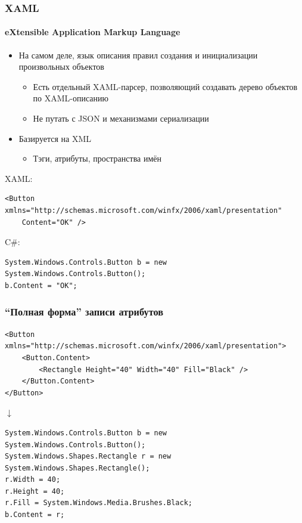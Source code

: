 \documentclass[xetex,mathserif,serif]{beamer}
\newcommand{\DownArrow} {
	\hspace{2cm}\begin{LARGE}$\downarrow$\end{LARGE}
}
\begin{document}
	\begin{frame}[fragile]
		\frametitle{XAML}
		\framesubtitle{eXtensible Application Markup Language}
		\begin{itemize}
			\item На самом деле, язык описания правил создания и инициализации произвольных объектов
			\begin{itemize}
				\item Есть отдельный XAML-парсер, позволяющий создавать дерево объектов по XAML-описанию
				\item Не путать с JSON и механизмами сериализации
			\end{itemize}
			\item Базируется на XML
			\begin{itemize}
				\item Тэги, атрибуты, пространства имён
			\end{itemize}
		\end{itemize}

		XAML:
		\begin{footnotesize}
			\begin{verbatim}
<Button xmlns="http://schemas.microsoft.com/winfx/2006/xaml/presentation"
    Content="OK" />
			\end{verbatim}
		\end{footnotesize}

		C\#:
		\begin{footnotesize}
			\begin{verbatim}
System.Windows.Controls.Button b = new System.Windows.Controls.Button();
b.Content = "OK";
			\end{verbatim}
		\end{footnotesize}
	\end{frame}

	\begin{frame}[fragile]
		\frametitle{``Полная форма'' записи атрибутов}
		\begin{footnotesize}
			\begin{verbatim}
<Button xmlns="http://schemas.microsoft.com/winfx/2006/xaml/presentation">
    <Button.Content>
        <Rectangle Height="40" Width="40" Fill="Black" />
    </Button.Content>
</Button>
			\end{verbatim}
		\end{footnotesize}

		\DownArrow
		\begin{footnotesize}
			\begin{verbatim}
System.Windows.Controls.Button b = new System.Windows.Controls.Button();
System.Windows.Shapes.Rectangle r = new System.Windows.Shapes.Rectangle();
r.Width = 40;
r.Height = 40;
r.Fill = System.Windows.Media.Brushes.Black;
b.Content = r;
			\end{verbatim}
		\end{footnotesize}
	\end{frame}
\end{document}
